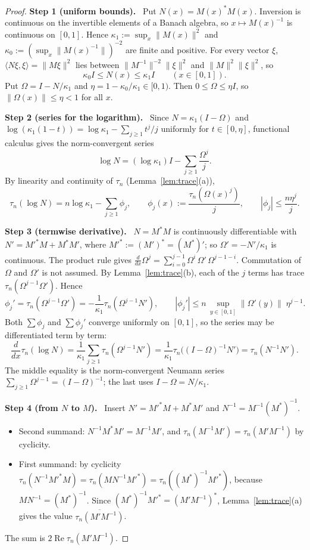 \documentclass[11pt]{article}
\theoremstyle{remark}
\numberwithin{equation}{section}
\newcommand{\step}[1]{\par\smallskip\noindent\textbf{Step #1.}\ }
\begin{document}
\begin{proof}
\step{1 (uniform bounds)}
Put $N(x)=M(x)^*M(x)$. Inversion is continuous on the invertible elements of a Banach algebra, so $x\mapsto M(x)^{-1}$ is continuous on $[0,1]$. Hence $\kappa_1:=\sup_x\|M(x)\|^2$ and $\kappa_0:=(\sup_x\|M(x)^{-1}\|)^{-2}$ are finite and positive. For every vector $\xi$, $\langle N\xi,\xi\rangle=\|M\xi\|^2$ lies between $\|M^{-1}\|^{-2}\|\xi\|^2$ and $\|M\|^2\|\xi\|^2$, so
\[
 \kappa_0I\le N(x)\le\kappa_1I\qquad(x\in[0,1]).
\]
Put $\Omega=I-N/\kappa_1$ and $\eta=1-\kappa_0/\kappa_1\in[0,1)$. Then $0\le\Omega\le\eta I$, so $\|\Omega(x)\|\le\eta<1$ for all $x$.

\step{2 (series for the logarithm)}
Since $N=\kappa_1(I-\Omega)$ and $\log(\kappa_1(1-t))=\log\kappa_1-\sum_{j\ge1}t^j/j$ uniformly for $t\in[0,\eta]$, functional calculus gives the norm-convergent series
\[
 \log N=(\log\kappa_1)I-\sum_{j\ge1}\frac{\Omega^j}{j}.
\]
By linearity and continuity of $\tau_n$ (Lemma~\ref{lem:trace}(a)),
\[
 \tau_n(\log N)=n\log\kappa_1-\sum_{j\ge1}\phi_j,\qquad \phi_j(x):=\frac{\tau_n(\Omega(x)^j)}{j},\qquad|\phi_j|\le\frac{n\eta^j}{j}.
\]

\step{3 (termwise derivative)}
$N=M^*M$ is continuously differentiable with $N'=M'^*M+M^*M'$, where $M'^*:=(M')^*=(M^*)'$; so $\Omega'=-N'/\kappa_1$ is continuous. The product rule gives $\frac{d}{dx}\Omega^j=\sum_{i=0}^{j-1}\Omega^i\,\Omega'\,\Omega^{j-1-i}$. Commutation of $\Omega$ and $\Omega'$ is not assumed. By Lemma~\ref{lem:trace}(b), each of the $j$ terms has trace $\tau_n(\Omega^{j-1}\Omega')$. Hence
\[
 \phi_j'=\tau_n(\Omega^{j-1}\Omega')=-\frac1{\kappa_1}\tau_n(\Omega^{j-1}N'),\qquad
 |\phi_j'|\le n\,\sup_{y\in[0,1]}\|\Omega'(y)\|\;\eta^{j-1}.
\]
Both $\sum\phi_j$ and $\sum\phi_j'$ converge uniformly on $[0,1]$, so the series may be differentiated term by term:
\[
 \frac{d}{dx}\tau_n(\log N)
 =\frac1{\kappa_1}\sum_{j\ge1}\tau_n(\Omega^{j-1}N')
 =\frac1{\kappa_1}\tau_n\bigl((I-\Omega)^{-1}N'\bigr)
 =\tau_n(N^{-1}N').
\]
The middle equality is the norm-convergent Neumann series $\sum_{j\ge1}\Omega^{j-1}=(I-\Omega)^{-1}$; the last uses $I-\Omega=N/\kappa_1$.

\step{4 (from $N$ to $M$)}
Insert $N'=M'^*M+M^*M'$ and $N^{-1}=M^{-1}(M^*)^{-1}$.
\begin{itemize}[leftmargin=2em]
\item Second summand: $N^{-1}M^*M'=M^{-1}M'$, and $\tau_n(M^{-1}M')=\tau_n(M'M^{-1})$ by cyclicity.
\item First summand: by cyclicity $\tau_n(N^{-1}M'^*M)=\tau_n(MN^{-1}M'^*)=\tau_n((M^*)^{-1}M'^*)$, because $MN^{-1}=(M^*)^{-1}$. Since $(M^*)^{-1}M'^*=(M'M^{-1})^*$, Lemma~\ref{lem:trace}(a) gives the value $\overline{\tau_n(M'M^{-1})}$.
\end{itemize}
The sum is $2\operatorname{Re}\tau_n(M'M^{-1})$.
\end{proof}
\end{document}
